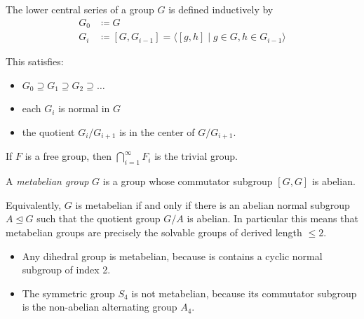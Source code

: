 \begin{definition}
	The lower central series of a group $G$ is defined inductively
	by 
	\begin{align*}
		G_{0} & \coloneqq G \\
		G_{i} & \coloneqq [G, G_{i-1}] = \langle [g, h] \mid g \in G, h \in G_{i-1} \rangle
	\end{align*}
\end{definition}

\begin{proposition}
	This satisfies:
	\begin{itemize}
		\item $G_0 \supseteq G_1 \supseteq G_2 \supseteq \ldots$
		\item each $G_{i}$ is normal in $G$
		\item the quotient $G_{i} / G_{i+1}$ is in the center of $G / G_{i+1}$.
	\end{itemize}
\end{proposition}

\begin{lemma}
	If $F$ is a free group, then $\bigcap_{i=1}^{\infty} F_{i}$ is the
	trivial group.
\end{lemma}


\begin{definition}
	A \textit{metabelian group}  $G$ is a group
	whose commutator subgroup $[G, G]$ is abelian.
	
	Equivalently, $G$ is metabelian if and only if there is an
	abelian normal subgroup $A \trianglelefteq G$
	such that the quotient group $G/A$ is abelian.
	In particular this means that metabelian groups
	are precisely the solvable groups of
	derived length
	$\le 2$.
\end{definition}

\begin{example}
	\begin{itemize}
		\item Any dihedral group is metabelian, because
		is contains a cyclic normal subgroup of index 2.
		
		\item The symmetric group $S_{4}$ is not metabelian, because
		its commutator subgroup is the non-abelian alternating
		group $A_{4}$.
	\end{itemize}
\end{example}


